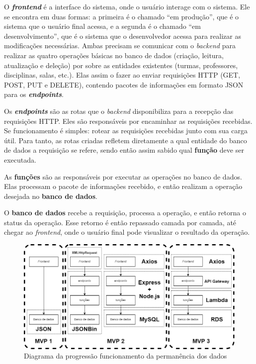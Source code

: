
O \textbf{\textit{frontend}} é a interface do sistema, onde o usuário interage com o sistema. Ele se encontra em duas formas: a primeira é o chamado ``em produção'', que é o sistema que o usuário final acessa, e a segunda é o chamado ``em desenvolvimento'', que é o sistema que o desenvolvedor acessa para realizar as modificações necessárias. Ambas precisam se comunicar com o \textit{backend} para realizar as quatro operações básicas no banco de dados (criação, leitura, atualização e deleção) por sobre as entidades existentes (turmas, professores, disciplinas, salas, etc.). Elas assim o fazer ao enviar requisições HTTP (GET, POST, PUT e DELETE), contendo pacotes de informações em formato JSON para os \textbf{\textit{endpoints}}.

Os \textbf{\textit{endpoints}} são as rotas que o \textit{backend} disponibiliza para a recepção das requisições HTTP. Eles são responsáveis por encaminhar as requisições recebidas. Se funcionamento é simples: rotear as requisições recebidas junto com sua carga útil. Para tanto, as rotas criadas refletem diretamente a qual entidade do banco de dados a requisição se refere, sendo então assim sabido qual \textbf{função} deve ser executada.

As \textbf{funções} são as responsáveis por executar as operações no banco de dados. Elas processam o pacote de informações recebido, e então realizam a operação desejada no \textbf{banco de dados}.

O \textbf{banco de dados} recebe a requisição, processa a operação, e então retorna o status da operação. Esse retorno é então repassado camada por camada, até chegar ao \textit{frontend}, onde o usuário final pode visualizar o resultado da operação.


\begin{figure}[htbp]
  \centering
  \caption{Diagrama da progressão funcionamento da permanência dos dados\label{fig:API}}
  \includegraphics[scale=0.5]{files/img/Codificacao/API - com diagrama.png}
  \legend{\selfAuthor}
\end{figure}

